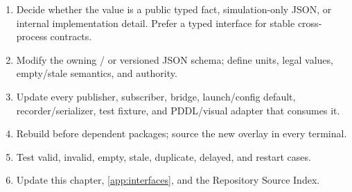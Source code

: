 \begin{procedurebox}
\begin{enumerate}
  \item Decide whether the value is a public typed fact, simulation-only JSON,
        or internal implementation detail. Prefer a typed interface for stable
        cross-process contracts.
  \item Modify the owning / or versioned JSON schema;
        define units, legal values, empty/stale semantics, and authority.
  \item Update every publisher, subscriber, bridge, launch/config default,
        recorder/serializer, test fixture, and PDDL/visual adapter that consumes it.
  \item Rebuild  before dependent packages; source
        the new overlay in every terminal.
  \item Test valid, invalid, empty, stale, duplicate, delayed, and restart cases.
  \item Update this chapter, \cref{app:interfaces}, and the Repository Source
        Index.
\end{enumerate}
\end{procedurebox}
